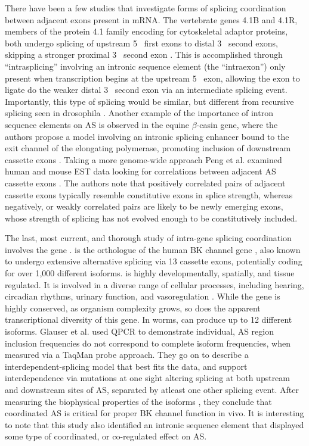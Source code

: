     There have been a few studies that investigate forms of splicing coordination between adjacent exons present in mRNA. The vertebrate genes 4.1B and 4.1R, members of the protein 4.1 family encoding for cytoskeletal adaptor proteins, both undergo splicing of upstream 5\textprime~ first exons to distal 3\textprime~ second exons, skipping a stronger proximal 3\textprime~ second exon \citep{Parra2008, Parra2012}. This is accomplished through ``intrasplicing'' involving an intronic sequence element (the ``intraexon'') only present when transcription begins at the upstream 5\textprime~ exon, allowing the exon to ligate do the weaker distal 3\textprime~ second exon via an intermediate splicing event. Importantly, this type of splicing would be similar, but different from recursive splicing seen in drosophila \citep{Burnette2005a}. Another example of the importance of intron sequence elements on AS is observed in the equine $\beta$-casin gene, where the authors propose a model involving an intronic splicing enhancer bound to the exit channel of the elongating polymerase, promoting inclusion of downstream cassette exons \citep{Lenasi2006}. Taking a more genome-wide approach Peng et al. examined human and mouse EST data looking for correlations between adjacent AS cassette exons \citep{Peng2008}. The authors note that positively correlated pairs of adjacent cassette exons typically resemble constitutive exons in splice strength, whereas negatively, or weakly correlated pairs are likely to be newly emerging exons, whose strength of splicing has not evolved enough to be constitutively included. 


    The last, most current, and thorough study of intra-gene splicing coordination involves the \worms{} gene \slo{} \citep{Glauser2011, Johnson2011}. \slo{} is the \worms{} orthologue of the human BK channel gene \kcnma{}, also known to undergo extensive alternative splicing \citep{Nilsen2010} via 13 cassette exons, potentially coding for over 1,000 different isoforms. \kcnma{} is highly developmentally, spatially, and tissue regulated. It is involved in a diverse range of cellular processes, including hearing, circadian rhythms, urinary function, and vasoregulation \citep{Fodor2009a}. While the gene is highly conserved, as organism complexity grows, so does the apparent transcriptional diversity of this gene. In worms, \slo{} can produce up to 12 different isoforms. Glauser et al. used QPCR to demonstrate individual, AS region inclusion frequencies do not correspond to complete isoform frequencies, when measured via a TaqMan probe approach. They go on to describe a interdependent-splicing model that best fits the data, and support interdependence via mutations at one sight altering splicing at both upstream and downstream sites of AS, separated by atleast one other splicing event. After measuring the biophysical properties of the isoforms \citep{Johnson2011}, they conclude that coordinated AS is critical for proper BK channel function in vivo. It is interesting to note that this study also identified an intronic sequence element that displayed some type of coordinated, or co-regulated effect on AS. 

